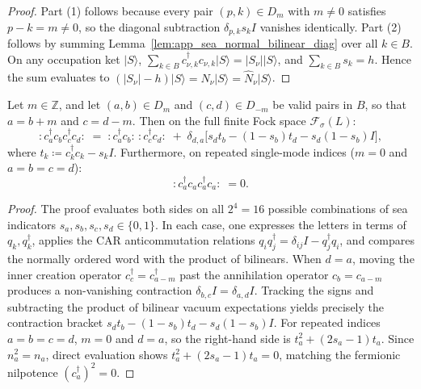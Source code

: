 \begin{proof}
Part (1) follows because every pair $(p, k) \in D_m$ with $m \neq 0$ satisfies $p - k = m \neq 0$, so the diagonal subtraction $\delta_{p, k} s_k I$ vanishes identically.
Part (2) follows by summing Lemma~\ref{lem:app_sea_normal_bilinear_diag} over all $k \in B$. On any occupation ket $|S\rangle$, $\sum_{k \in B} c_{\nu, k}^\dagger c_{\nu, k} |S\rangle = |S_\nu| |S\rangle$, and $\sum_{k \in B} s_k = h$. Hence the sum evaluates to $(|S_\nu| - h) |S\rangle = N_\nu |S\rangle = \hat{N}_\nu |S\rangle$.
\end{proof}

\begin{theorem}
\label{thm:app_quartic_sea_wick}
Let $m \in \mathbb{Z}$, and let $(a, b) \in D_m$ and $(c, d) \in D_{-m}$ be valid pairs in $B$, so that $a = b + m$ and $c = d - m$.
Then on the full finite Fock space $\mathcal{F}_\sigma(L)$:
\begin{equation}
\label{eq:app_quartic_wick}
:\! c_a^\dagger c_b c_c^\dagger c_d \!: \;= \;:\! c_a^\dagger c_b \!:\, :\! c_c^\dagger c_d \!: \;+ \; \delta_{d, a} \Big[ s_d t_b - (1 - s_b) t_d - s_d (1 - s_b) I \Big],
\end{equation}
where $t_k \coloneqq c_k^\dagger c_k - s_k I$.
Furthermore, on repeated single-mode indices ($m = 0$ and $a = b = c = d$):
\begin{equation}
:\! c_a^\dagger c_a c_a^\dagger c_a \!: \;= 0.
\end{equation}
\end{theorem}

\begin{proof}
The proof evaluates both sides on all $2^4 = 16$ possible combinations of sea indicators $s_a, s_b, s_c, s_d \in \{0, 1\}$.
In each case, one expresses the letters in terms of $q_k, q_k^\dagger$, applies the CAR anticommutation relations $q_i q_j^\dagger = \delta_{ij} I - q_j^\dagger q_i$, and compares the normally ordered word with the product of bilinears.
When $d = a$, moving the inner creation operator $c_c^\dagger = c_{a-m}^\dagger$ past the annihilation operator $c_b = c_{a-m}$ produces a non-vanishing contraction $\delta_{b, c} I = \delta_{a, d} I$. Tracking the signs and subtracting the product of bilinear vacuum expectations yields precisely the contraction bracket $s_d t_b - (1 - s_b) t_d - s_d(1 - s_b) I$.
For repeated indices $a = b = c = d$, $m = 0$ and $d = a$, so the right-hand side is $t_a^2 + (2s_a - 1)t_a$. Since $n_a^2 = n_a$, direct evaluation shows $t_a^2 + (2s_a - 1)t_a = 0$, matching the fermionic nilpotence $(c_a^\dagger)^2 = 0$.
\end{proof}

